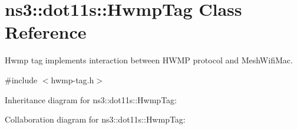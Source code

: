 \hypertarget{classns3_1_1dot11s_1_1HwmpTag}{}\section{ns3\+:\+:dot11s\+:\+:Hwmp\+Tag Class Reference}
\label{classns3_1_1dot11s_1_1HwmpTag}


Hwmp tag implements interaction between H\+W\+MP protocol and Mesh\+Wifi\+Mac.  




{\ttfamily \#include $<$hwmp-\/tag.\+h$>$}



Inheritance diagram for ns3\+:\+:dot11s\+:\+:Hwmp\+Tag\+:


Collaboration diagram for ns3\+:\+:dot11s\+:\+:Hwmp\+Tag\+:
